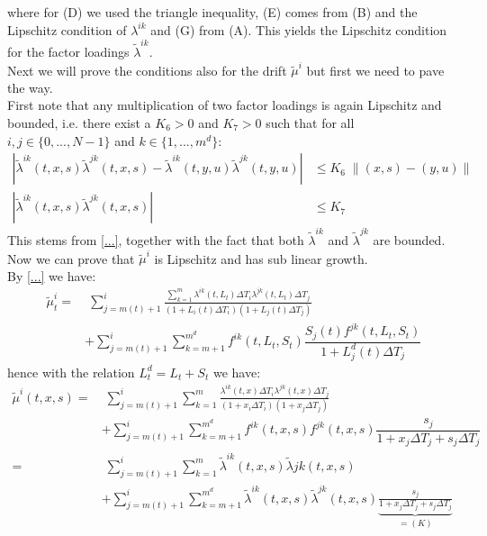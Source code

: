 \documentclass[12pt]{article}
\begin{document}
where for (D) we used the triangle inequality, (E) comes from (B) and the Lipschitz condition of $\lambda^{i k}$ and (G) from (A). This yields the Lipschitz condition for the factor loadings $\tilde{\lambda}^{ik}$.\\
Next we will prove the conditions also for the drift $\tilde{\mu}^i$ but first we need to pave the way. \\
First note that any multiplication of two factor loadings is again Lipschitz and bounded, i.e. there exist a $K_6 > 0$ and $K_7>0$ such that for all $i, j \in \{0,...,N-1\}$ and $k\in\{1,...,m^d\}$:
\begin{align*}
	\left|\tilde{\lambda}^{i k}\left(t,x, s\right)\tilde{\lambda}^{j k}\left(t,x, s\right) - \tilde{\lambda}^{i k}\left(t,y, u\right)\tilde{\lambda}^{j k}\left(t,y, u\right)\right| &\le K_6\; \lVert(x,s) - (y,u)\rVert \\
	\left|\tilde{\lambda}^{i k}\left(t,x, s\right)\tilde{\lambda}^{j k}\left(t,x, s\right)\right| &\le K_7\tag{H}
\end{align*}
This stems from \cref{...}, together with the fact that both $\tilde{\lambda}^{i k}$ and $\tilde{\lambda}^{j k}$ are bounded.\\
Now we can prove that $\tilde{\mu}^i$ is Lipschitz and has sub linear growth.\\
By \cref{...} we have:
\begin{align*}
	\tilde{\mu}^i_t = &\; \sum_{j=m(t)+1}^{i}\frac{\sum_{k=1}^{m}\lambda^{i k}\left(t, L_t\right) \Delta T_i \lambda^{j k}\left(t, L_t\right) \Delta T_j}{(1 + L_i(t)\Delta T_i) (1 + L_j(t)\Delta T_j)}\\
	&+ \sum_{j=m(t)+1}^{i}\sum_{k=m+1}^{m^d}f^{i k}(t,L_t,S_t)\dfrac{S_j(t)f^{j k}(t,L_t,S_t)}{1 + L^d_j(t)\Delta T_j}
\end{align*}
hence with the relation $L^d_t = L_t + S_t$  we have:
\begin{align*}
	\tilde{\mu}^i\left(t, x, s\right) = &\; \sum_{j=m(t)+1}^{i}\sum_{k=1}^{m}\frac{\lambda^{i k}\left(t, x\right) \Delta T_i \lambda^{j k}\left(t, x\right) \Delta T_j}{(1 + x_i\Delta T_i) (1 + x_j\Delta T_j)}\\
	&+ \sum_{j=m(t)+1}^{i}  \sum_{k=m+1}^{m^d}  f^{i k}(t,x,s)f^{j k}(t,x,s)\dfrac{s_j}{1 + x_j\Delta T_j + s_j\Delta T_j}\\
	=&\; \sum_{j=m(t)+1}^{i}\sum_{k=1}^{m}\tilde{\lambda}^{i k}\left(t, x, s\right)\tilde{\lambda}{j k}\left(t, x, s\right)\tag{I}\\
	&+ \sum_{j=m(t)+1}^{i}  \sum_{k=m+1}^{m^d}  \tilde{\lambda}^{i k}\left(t, x, s\right)\tilde{\lambda}^{j k}\left(t, x, s\right)\underbrace{\frac{s_j}{1 + x_j\Delta T_j + s_j\Delta T_j}}_{=(K)}\tag{J}
\end{align*}
\end{document}
